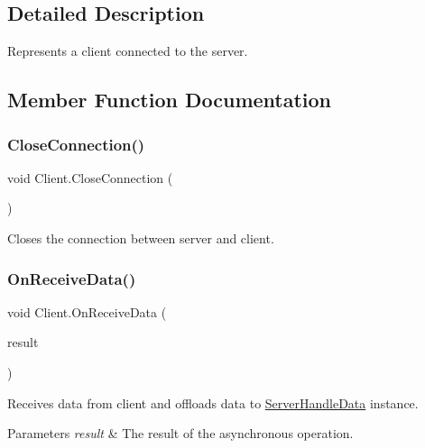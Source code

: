 \subsection{Detailed Description}
Represents a client connected to the server. 



\subsection{Member Function Documentation}
\mbox{\label{class_client_a0853fff639f944efdb84e2537dd79328}} 
\subsubsection{\texorpdfstring{CloseConnection()}{CloseConnection()}}
{\footnotesize\ttfamily void Client.\+Close\+Connection (\begin{DoxyParamCaption}{ }\end{DoxyParamCaption})\hspace{0.3cm}{\ttfamily [private]}}



Closes the connection between server and client. 

\mbox{\label{class_client_aec3eb642e59dcdd301840d640a773165}} 
\subsubsection{\texorpdfstring{OnReceiveData()}{OnReceiveData()}}
{\footnotesize\ttfamily void Client.\+On\+Receive\+Data (\begin{DoxyParamCaption}\item[{I\+Async\+Result}]{result }\end{DoxyParamCaption})\hspace{0.3cm}{\ttfamily [private]}}



Receives data from client and offloads data to \mbox{\hyperlink{class_server_handle_data}{Server\+Handle\+Data}} instance. 


\begin{DoxyParams}{Parameters}
{\em result} & The result of the asynchronous operation.\\
\hline
\end{DoxyParams}
\mbox{\label{class_client_a4d27949eb305b5b84772396a3dac9c76}} 
